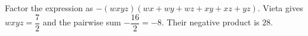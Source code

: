 Factor the expression as $-(wxyz)(wx+wy+wz+xy+xz+yz)$. Vieta gives $wxyz=\dfrac{7}{2}$ and the pairwise sum $-\dfrac{16}{2}=-8$. Their negative product is $\boxed{28}$.
